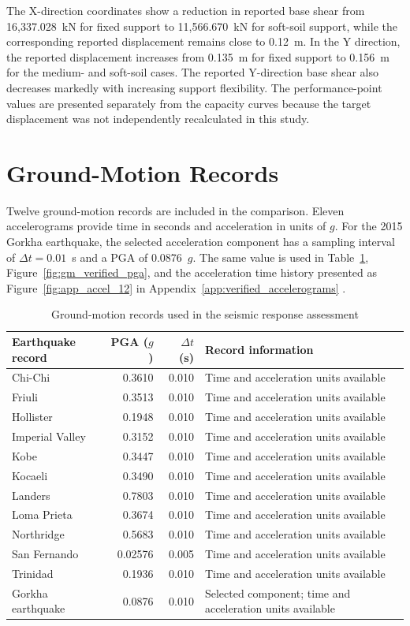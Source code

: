The X-direction coordinates show a reduction in reported base shear from 16,337.028~kN for fixed support to 11,566.670~kN for soft-soil support, while the corresponding reported displacement remains close to 0.12~m. In the Y direction, the reported displacement increases from 0.135~m for fixed support to 0.156~m for the medium- and soft-soil cases. The reported Y-direction base shear also decreases markedly with increasing support flexibility. The performance-point values are presented separately from the capacity curves because the target displacement was not independently recalculated in this study.

\section{Ground-Motion Records}
Twelve ground-motion records are included in the comparison. Eleven accelerograms provide time in seconds and acceleration in units of $g$. For the 2015 Gorkha earthquake, the selected acceleration component has a sampling interval of $\Delta t=0.01$~s and a PGA of 0.0876~$g$. The same value is used in Table~\ref{tab:gm_verified_records}, Figure~\ref{fig:gm_verified_pga}, and the acceleration time history presented as Figure~\ref{fig:app_accel_12} in Appendix~\ref{app:verified_accelerograms} \cite{takai2016gorkha,shigefuji2022gorkha}.

\begin{table}[htbp]
\caption{Ground-motion records used in the seismic response assessment}
\label{tab:gm_verified_records}
\centering
\small
\begin{tabular}{lrrp{5.0cm}}
\hline\hline
Earthquake record & PGA ($g$) & $\Delta t$ (s) & Record information \\ \hline
Chi-Chi & 0.3610 & 0.010 & Time and acceleration units available \\
Friuli & 0.3513 & 0.010 & Time and acceleration units available \\
Hollister & 0.1948 & 0.010 & Time and acceleration units available \\
Imperial Valley & 0.3152 & 0.010 & Time and acceleration units available \\
Kobe & 0.3447 & 0.010 & Time and acceleration units available \\
Kocaeli & 0.3490 & 0.010 & Time and acceleration units available \\
Landers & 0.7803 & 0.010 & Time and acceleration units available \\
Loma Prieta & 0.3674 & 0.010 & Time and acceleration units available \\
Northridge & 0.5683 & 0.010 & Time and acceleration units available \\
San Fernando & 0.02576 & 0.005 & Time and acceleration units available \\
Trinidad & 0.1936 & 0.010 & Time and acceleration units available \\
Gorkha earthquake & 0.0876 & 0.010 & Selected component; time and acceleration units available \\ \hline\hline
\end{tabular}
\end{table}

